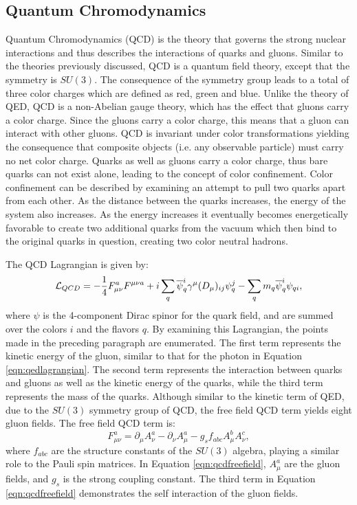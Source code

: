 \subsection{Quantum Chromodynamics}
\label{sec:qcd}

Quantum Chromodynamics (QCD)  is the theory that governs the strong nuclear interactions and thus describes the interactions of quarks and gluons. 
Similar to the theories previously discussed, QCD is a quantum field theory, except that the symmetry is $SU(3)$.
The consequence of the symmetry group leads to a total of three color charges which are defined as red, green and blue.
Unlike the theory of QED, QCD is a non-Abelian gauge theory, which has the effect that gluons carry a color charge. 
Since the gluons carry a color charge, this means that a gluon can interact with other gluons.
QCD is invariant under color transformations yielding the consequence that composite objects (i.e. any observable particle) must carry no net color charge.
Quarks as well as gluons carry a color charge, thus bare quarks can not exist alone, leading to the concept of color confinement.
Color confinement can be described by examining an attempt to pull two quarks apart from each other. 
As the distance between the quarks increases, the energy of the system also increases.
As the energy increases it eventually becomes energetically favorable to create two additional quarks from the vacuum which then bind to the original quarks in question, creating two color neutral hadrons.

The QCD Lagrangian is given by:
\begin{equation}
\mathcal{L}_{QCD} = -\frac{1}{4}F_{\mu\nu}^{a}F^{\mu\nu a} + i\sum_{q}\overline{\psi}_{q}^{i}\gamma^{\mu}(D_{\mu})_{ij}\psi_{q}^{j} - \sum_{q}m_{q}\overline{\psi}_{q}^{i}\psi_{qi}, 
\end{equation}
where $\psi$ is the 4-component Dirac spinor for the quark field, and are summed over the colors $i$ and the flavors $q$.
By examining this Lagrangian, the points made in the preceding paragraph are enumerated.
The first term represents the kinetic energy of the gluon, similar to that for the photon in Equation \ref{eqn:qedlagrangian}.
The second term represents the interaction between quarks and gluons as well as the kinetic energy of the quarks, while the third term represents the mass of the quarks.
Although similar to the kinetic term of QED, due to the $SU(3)$ symmetry group of QCD, the free field QCD term yields eight gluon fields.
The free field QCD term is:
\begin{equation}
F_{\mu\nu}^{a} = \partial_{\mu}A_{\nu}^{a} - \partial_{\nu}A_{\mu}^{a} - g_{s}f_{abc}A_{\mu}^{b}A_{\nu}^{c},
\label{eqn:qcdfreefield}
\end{equation}
where $f_{abc}$ are the structure constants of the $SU(3)$ algebra, playing a similar role to the Pauli spin matrices.
In Equation \ref{eqn:qcdfreefield}, $A_{\mu}^{a}$ are the gluon fields, and $g_{s}$ is the strong coupling constant.
The third term in Equation \ref{eqn:qcdfreefield} demonstrates the self interaction of the gluon fields.

